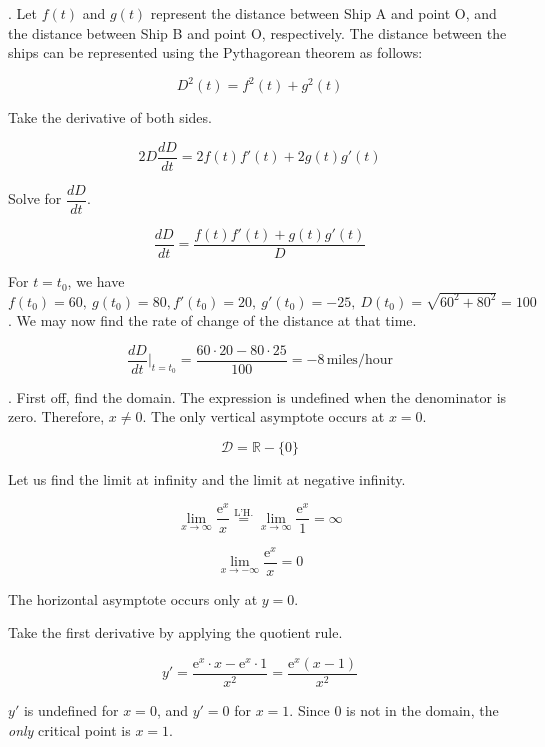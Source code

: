 \documentclass{article}
\begin{document}
. Let $f(t)$ and $g(t)$ represent the distance between Ship A and point O, and the distance between Ship B and point O, respectively. The distance between the ships can be represented using the Pythagorean theorem as follows:

\[D^2(t)=f^2(t)+g^2(t)\]

\hfill

\noindent Take the derivative of both sides.

\[2D\frac{dD}{dt} = 2f(t)f'(t) + 2g(t)g'(t)\]

\hfill

\noindent Solve for $\dfrac{dD}{dt}$.

\[
\frac{dD}{dt} = \frac{f(t)f'(t) + g(t)g'(t)}{\displaystyle D}
\]

\hfill

\noindent For $t=t_0$, we have $f(t_0)=60,\:g(t_0)=80,f'(t_0)=20,\:g'(t_0)=-25,\:D(t_0)=\sqrt{60^2+80^2}=100$. We may now find the rate of change of the distance at that time.

\[\frac{dD}{dt}\Bigg|_{t=t_0} = \frac{60\cdot 20 -80 \cdot 25}{\displaystyle 100} = \boxed{-8 \, \text{miles/hour}}\]

\hfill

. First off, find the domain. The expression is undefined when the denominator is zero. Therefore, $x\neq 0$. The only vertical asymptote occurs at $x = 0$.

\[\mathcal{D} = \mathbb{R} - \{0\}\]

\hfill

\noindent Let us find the limit at infinity and the limit at negative infinity.

\[\lim_{x\to\infty}\frac{\mathrm{e}^x}{x}\overset{\text{L'H.}}{=}\lim_{x\to\infty}\frac{\mathrm{e}^x}{1}=\infty\]

\[\lim_{x\to-\infty}\frac{\mathrm{e}^x}{x}=0\]

\hfill

\noindent The horizontal asymptote occurs only at $y=0$.

\hfill

\noindent Take the first derivative by applying the quotient rule.

\[y'=\frac{\mathrm{e}^x\cdot x-\mathrm{e}^x\cdot1}{x^2}=\frac{\mathrm{e}^x(x-1)}{x^2}\]

\hfill

\noindent $y'$ is undefined for $x=0$, and $y'=0$ for $x=1$. Since 0 is not in the domain, the \textit{only} critical point is $x=1$.
\end{document}
